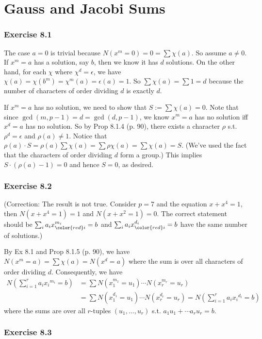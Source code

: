 \documentclass[../Chapter.tex]{subfiles}
\begin{document}
\chapter{Gauss and Jacobi Sums}

\subsection*{Exercise 8.1}

The case $a=0$ is trivial because $N(x^m=0)=0=\sum \chi(a)$. So assume $a\neq 0$. If $x^m=a$ has a solution, say $b$, then we know it has $d$ solutions. On the other hand, for each $\chi$ where $\chi^d=\epsilon$, we have $\chi(a)=\chi(b^m)=\chi^m(a)=\epsilon(a)=1$. So $\sum\chi(a)=\sum 1=d$ because the number of characters of order dividing $d$ is exactly $d$.

If $x^m=a$ has no solution, we need to show that $S:=\sum\chi(a)=0$. Note that since $\gcd(m,p-1)=d=\gcd(d,p-1)$, we know $x^m=a$ has no solution iff $x^d=a$ has no solution. So by Prop 8.1.4 (p. 90), there exists a character $\rho$ s.t. $\rho^d=\epsilon$ and $\rho(a)\neq1$. Notice that $\rho(a)\cdot S=\rho(a)\sum\chi(a)=\sum\rho\chi(a)=\sum\chi(a)=S$. (We've used the fact that the characters of order dividing $d$ form a group.) This implies $S\cdot(\rho(a)-1)=0$ and hence $S=0$, as desired.

\subsection*{Exercise 8.2}

(Correction: The result is not true. Consider $p=7$ and the equation $x+x^4=1$, then $N(x+x^4=1)=1$ and $N(x+x^2=1)=0$. The correct statement should be $\sum_i a_ix_{\color{red}i}^{m_i}=b$ and $\sum_i a_ix_{\color{red}i}^{d_i}=b$ have the same number of solutions.)

By Ex 8.1 and Prop 8.1.5 (p. 90), we have $N(x^m=a)=\sum \chi(a)=N(x^d=a)$ where the sum is over all characters of order dividing $d$. Consequently, we have
\begin{align*}
N\left(\sum_{i=1}^r a_i{x_i}^{m_i}=b\right) &= \sum N(x_1^{m_1}=u_1)\cdots N(x_r^{m_r}=u_r) \\
&= \sum N(x_1^{d_1}=u_1)\cdots N(x_r^{d_r}=u_r) = N\left(\sum_{i=1}^r a_i{x_i}^{d_i}=b\right)
\end{align*}
where the sums are over all $r$-tuples $(u_1,\ldots,u_r)$ s.t. $a_1u_1+\cdots a_ru_r=b$.

\subsection*{Exercise 8.3}
\end{document}
